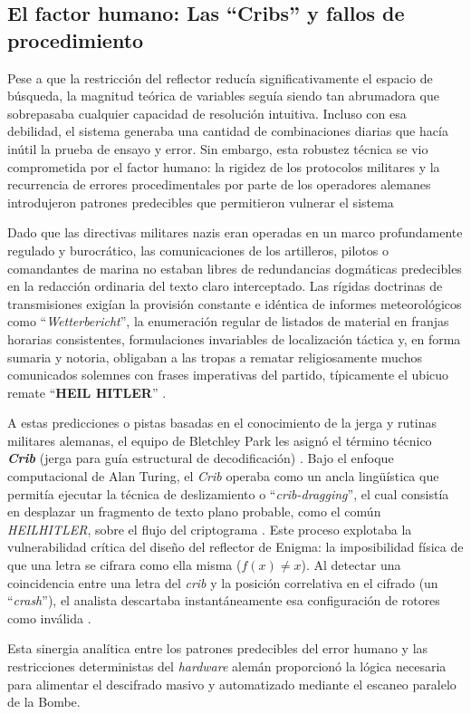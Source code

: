 \subsection{El factor humano: Las ``Cribs'' y fallos de procedimiento}

Pese a que la restricción del reflector reducía significativamente el espacio de búsqueda, la magnitud teórica de variables seguía siendo tan abrumadora que sobrepasaba cualquier capacidad de resolución intuitiva. Incluso con esa debilidad, el sistema generaba una cantidad de combinaciones diarias que hacía inútil la prueba de ensayo y error. Sin embargo, esta robustez técnica se vio comprometida por el factor humano: la rigidez de los protocolos militares y la recurrencia de errores procedimentales por parte de los operadores alemanes introdujeron patrones predecibles que permitieron vulnerar el sistema \cite{copeland2006colossus}

Dado que las directivas militares nazis eran operadas en un marco profundamente regulado y burocrático, las comunicaciones de los artilleros, pilotos o comandantes de marina no estaban libres de redundancias dogmáticas predecibles en la redacción ordinaria del texto claro interceptado. Las rígidas doctrinas de transmisiones exigían la provisión constante e idéntica de informes meteorológicos como ``\textit{Wetterbericht}'', la enumeración regular de listados de material en franjas horarias consistentes, formulaciones invariables de localización táctica y, en forma sumaria y notoria, obligaban a las tropas a rematar religiosamente muchos comunicados solemnes con frases imperativas del partido, típicamente el ubicuo remate ``\textbf{HEIL HITLER}'' \cite{copeland2006colossus}. 

A estas predicciones o pistas basadas en el conocimiento de la jerga y rutinas militares alemanas, el equipo de Bletchley Park les asignó el término técnico \textbf{\textit{Crib}} (jerga para guía estructural de decodificación) \cite{copeland2004essential}. Bajo el enfoque computacional de Alan Turing, el \textit{Crib} operaba como un ancla lingüística que permitía ejecutar la técnica de deslizamiento o ``\textit{crib-dragging}'', el cual consistía en desplazar un fragmento de texto plano probable, como el común \textit{HEILHITLER}, sobre el flujo del criptograma \cite{copeland2006colossus}. Este proceso explotaba la vulnerabilidad crítica del diseño del reflector de Enigma: la imposibilidad física de que una letra se cifrara como ella misma ($f(x) \neq x$). Al detectar una coincidencia entre una letra del \textit{crib} y la posición correlativa en el cifrado (un ``\textit{crash}''), el analista descartaba instantáneamente esa configuración de rotores como inválida \cite{copeland2004essential}. 

Esta sinergia analítica entre los patrones predecibles del error humano y las restricciones deterministas del \textit{hardware} alemán proporcionó la lógica necesaria para alimentar el descifrado masivo y automatizado mediante el escaneo paralelo de la Bombe.